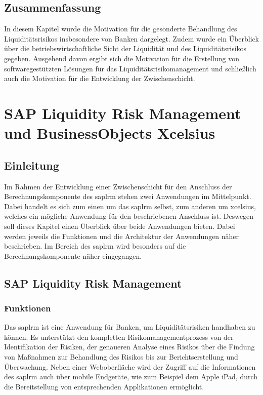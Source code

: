 \begin{onehalfspacing}
\section{Zusammenfassung}
In diesem Kapitel wurde die Motivation für die gesonderte Behandlung des Liquiditätsrisikos insbesondere von Banken dargelegt. Zudem wurde ein Überblick über die betriebswirtschaftliche Sicht der Liquidität und des Liquiditätsrisikos gegeben. Ausgehend davon ergibt sich die Motivation für die Erstellung von softwaregestützten Lösungen für das Liquiditätsrisikomanagement und schließlich auch die Motivation für die Entwicklung der Zwischenschicht.

\chapter{SAP Liquidity Risk Management und BusinessObjects Xcelsius}
\section{Einleitung}
Im Rahmen der Entwicklung einer Zwischenschicht für den Anschluss der Berechnungskomponente des \gls{saplrm} stehen zwei Anwendungen im Mittelpunkt. Dabei handelt es sich zum einen um das \gls{saplrm} selbst, zum anderen um \gls{xcelsius}, welches ein mögliche Anwendung für den beschriebenen Anschluss ist. Deswegen soll dieses Kapitel einen Überblick über beide Anwendungen bieten. Dabei werden jeweils die Funktionen und die Architektur der Anwendungen näher beschrieben. Im Bereich des \gls{saplrm} wird besonders auf die Berechnungskomponente näher eingegangen.

\section{SAP Liquidity Risk Management}

\subsection{Funktionen}
Das \gls{saplrm} ist eine Anwendung für Banken, um Liquiditätsrisiken handhaben zu können. Es unterstützt den kompletten Risikomanagementprozess von der Identifikation der Risiken, der genaueren Analyse eines Risikos über die Findung von Maßnahmen zur Behandlung des Risikos bis zur Berichtserstellung und Überwachung. Neben einer Weboberfläche wird der Zugriff auf die Informationen des \gls{saplrm} auch über mobile Endgeräte, wie zum Beispiel dem Apple iPad, durch die Bereitstellung von entsprechenden Applikationen ermöglicht.


\end{onehalfspacing}

